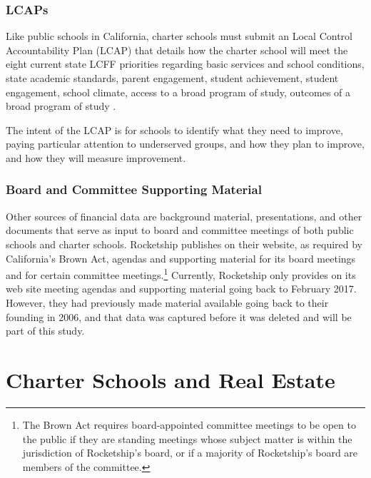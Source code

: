 \subsubsection{LCAPs}\label{sec:cs-lcaps}%

Like public schools in California, charter schools must submit an Local Control Accountability Plan (LCAP) that details how the charter school will meet the eight current state LCFF priorities regarding basic services and school conditions, state academic standards, parent engagement, student achievement, student engagement, school climate, access to a broad program of study, outcomes of a broad program of study \parencite[67–68]{Aguinaldo.etal2023}.

The intent of the LCAP is for schools to identify what they need to improve, paying particular attention to underserved groups, and how they plan to improve, and how they will measure improvement. 

\subsubsection{Board and Committee Supporting Material}\label{sec:board-committee-packets}%

Other sources of financial data are background material, presentations, and other documents that serve as input to board and committee meetings of both public schools and charter schools.  Rocketship publishes on their website, as required by California's Brown Act, agendas and supporting material for its board meetings and for certain committee meetings.\footnote{The Brown Act requires board-appointed committee meetings to be open to the public if they are standing meetings whose subject matter is within the jurisdiction of Rocketship's board, or if a majority of Rocketship's board are members of the committee.} Currently, Rocketship only provides on its web site meeting agendas and supporting material going back to February 2017. However, they had previously made material available going back to their founding in 2006, and that data was captured before it was deleted and will be part of this study.

\section{Charter Schools and Real Estate}\label{sec:real-estate}%

